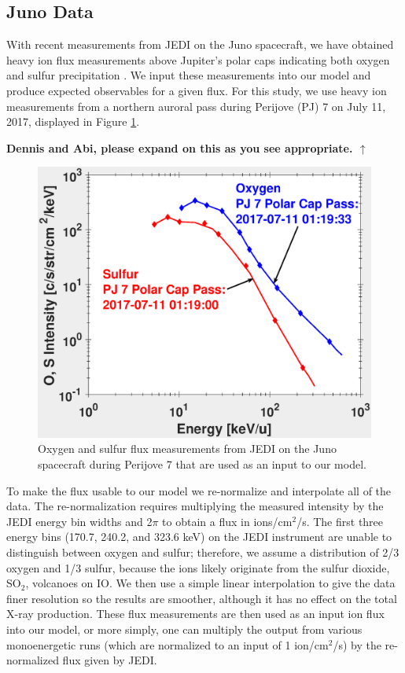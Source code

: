 \documentclass[draft]{agujournal2018}
\begin{document}
\subsection{Juno Data}

With recent measurements from JEDI \citep{mauk2017ssr} on the Juno spacecraft, we have obtained heavy ion flux measurements above Jupiter's polar caps indicating both oxygen and sulfur precipitation \citep{haggerty2017,clark2017a,clark2017b}.
We input these measurements into our model and produce expected observables for a given flux.
For this study, we use heavy ion measurements from a northern auroral pass during Perijove (PJ) 7 on July 11, 2017, displayed in Figure \ref{fig:JEDIFlux}.

\noindent\textbf{\Large Dennis and Abi, please expand on this as you see appropriate. $\uparrow$}

\begin{figure}[ht]
    \centering
    \includegraphics[width=\textwidth]{Figures/O+S_PJ7.eps}
    \caption{Oxygen and sulfur flux measurements from JEDI on the Juno spacecraft during Perijove 7 that are used as an input to our model.}
    \label{fig:JEDIFlux}
\end{figure}

To make the flux usable to our model we re-normalize and interpolate all of the data.
The re-normalization requires multiplying the measured intensity by the JEDI energy bin widths \citep{mauk2017ssr} and 2$\pi$ to obtain a flux in ions/cm$^2$/s.
The first three energy bins (170.7, 240.2, and 323.6 keV) on the JEDI instrument are unable to distinguish between oxygen and sulfur; therefore, we assume a distribution of 2/3 oxygen and 1/3 sulfur, because the ions likely originate from the sulfur dioxide, SO$_2$, volcanoes on IO.
We then use a simple linear interpolation to give the data finer resolution so the results are smoother, although it has no effect on the total X-ray production.
These flux measurements are then used as an input ion flux into our model, or more simply, one can multiply the output from various monoenergetic runs (which are normalized to an input of 1 ion/cm$^2$/s) by the re-normalized flux given by JEDI.
\end{document}
